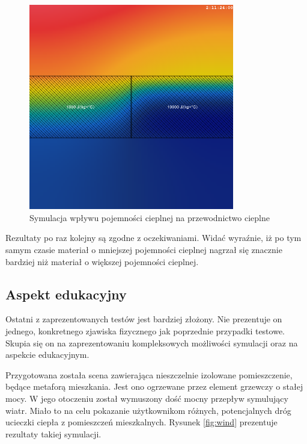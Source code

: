 \begin{figure}[!h]
\centering
\includegraphics[width=0.8\textwidth]{img/physics/heatCapacity}
\caption{Symulacja wpływu pojemności cieplnej na przewodnictwo cieplne}
\label{fig:heatCapacity}
\end{figure}


Rezultaty po raz kolejny są zgodne z oczekiwaniami. Widać wyraźnie, iż po tym
samym czasie materiał o mniejszej pojemności cieplnej nagrzał się znacznie
bardziej niż materiał o większej pojemności cieplnej.

\subsection{Aspekt edukacyjny}

Ostatni z zaprezentowanych testów jest bardziej złożony. Nie prezentuje on
jednego, konkretnego zjawiska fizycznego jak poprzednie przypadki testowe.
Skupia się on na zaprezentowaniu kompleksowych możliwości symulacji oraz na
aspekcie edukacyjnym.

Przygotowana została scena zawierająca nieszczelnie izolowane pomieszczenie,
będące metaforą mieszkania. Jest ono ogrzewane przez element grzewczy o stałej
mocy. W jego otoczeniu został wymuszony dość mocny przepływ symulujący wiatr.
Miało to na celu pokazanie użytkownikom różnych, potencjalnych dróg ucieczki
ciepła z pomieszczeń mieszkalnych. Rysunek \ref{fig:wind} prezentuje rezultaty
takiej symulacji.


